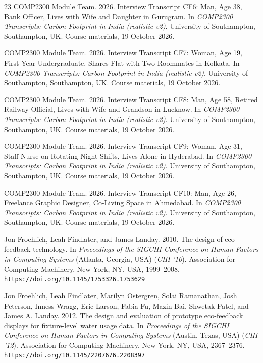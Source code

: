 \documentclass[12pt, a4paper]{article}
\newcommand{\doi}[1]{\href{https://doi.org/#1}{\nolinkurl{https://doi.org/#1}}}
\begin{document}
\begin{thebibliography}{23}
COMP2300 Module Team. 2026. Interview Transcript CF6: Man, Age 38, Bank Officer, Lives with Wife and Daughter in Gurugram. In \textit{COMP2300 Transcripts: Carbon Footprint in India (realistic v2)}. University of Southampton, Southampton, UK. Course materials, 19 October 2026.

COMP2300 Module Team. 2026. Interview Transcript CF7: Woman, Age 19, First-Year Undergraduate, Shares Flat with Two Roommates in Kolkata. In \textit{COMP2300 Transcripts: Carbon Footprint in India (realistic v2)}. University of Southampton, Southampton, UK. Course materials, 19 October 2026.

COMP2300 Module Team. 2026. Interview Transcript CF8: Man, Age 58, Retired Railway Official, Lives with Wife and Grandson in Lucknow. In \textit{COMP2300 Transcripts: Carbon Footprint in India (realistic v2)}. University of Southampton, Southampton, UK. Course materials, 19 October 2026.

COMP2300 Module Team. 2026. Interview Transcript CF9: Woman, Age 31, Staff Nurse on Rotating Night Shifts, Lives Alone in Hyderabad. In \textit{COMP2300 Transcripts: Carbon Footprint in India (realistic v2)}. University of Southampton, Southampton, UK. Course materials, 19 October 2026.

COMP2300 Module Team. 2026. Interview Transcript CF10: Man, Age 26, Freelance Graphic Designer, Co-Living Space in Ahmedabad. In \textit{COMP2300 Transcripts: Carbon Footprint in India (realistic v2)}. University of Southampton, Southampton, UK. Course materials, 19 October 2026.

Jon Froehlich, Leah Findlater, and James Landay. 2010. The design of eco-feedback technology. In \textit{Proceedings of the SIGCHI Conference on Human Factors in Computing Systems} (Atlanta, Georgia, USA) (\textit{CHI '10}). Association for Computing Machinery, New York, NY, USA, 1999--2008. \doi{10.1145/1753326.1753629}

Jon Froehlich, Leah Findlater, Marilyn Ostergren, Solai Ramanathan, Josh Peterson, Inness Wragg, Eric Larson, Fabia Fu, Mazin Bai, Shwetak Patel, and James A. Landay. 2012. The design and evaluation of prototype eco-feedback displays for fixture-level water usage data. In \textit{Proceedings of the SIGCHI Conference on Human Factors in Computing Systems} (Austin, Texas, USA) (\textit{CHI '12}). Association for Computing Machinery, New York, NY, USA, 2367--2376. \doi{10.1145/2207676.2208397}


\end{thebibliography}
\end{document}
